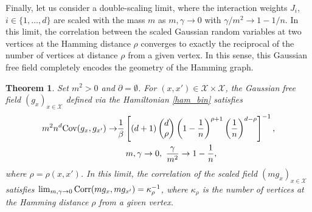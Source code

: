 \documentclass[a4paper,11pt]{article}
\theoremstyle{plain}
\newtheorem{theorem}{Theorem}[section]
\theoremstyle{definition}
\begin{document}
Finally, let us consider a double-scaling limit, where
the interaction weights $J_i$, $i\in\{1,\ldots,d\}$
are scaled with the mass $m$ as $m,\gamma\to 0$ with
$\gamma/m^2\to 1-1/n$. In this limit, the correlation
between the scaled Gaussian random variables at two
vertices at the Hamming distance $\rho$ converges to
exactly the reciprocal of the number of vertices at
distance $\rho$ from a given vertex. In this sense, this
Gaussian free field completely encodes the geometry
of the Hamming graph.

\begin{theorem}\label{thm:binom:lim}
  Set $m^2>0$ and $\partial=\emptyset$. For
  $(x,x')\in\mathcal{X}\times\mathcal{X}$, the Gaussian free field
  $(g_x)_{x\in\mathcal{X}}$ defined via
  the Hamiltonian \eqref{ham_bin} satisfies
  \begin{align*}
    m^2n^d{\rm Cov}(g_x,g_{x'})\to &
    \frac{1}{\beta}\left[(d+1)\begin{pmatrix}d\\\rho\end{pmatrix}\left(1-\frac{1}{n}\right)^{\rho+1}\left(\frac{1}{n}\right)^{d-\rho}\right]^{-1}, \\
   & \quad m,\gamma\to 0,~\frac{\gamma}{m^2}\to 1-\frac{1}{n},
  \end{align*}
  where $\rho=\rho(x,x')$. In this limit, the correlation of the scaled field
  $(mg_x)_{x\in\mathcal{X}}$ satisfies
  $\lim_{m,\gamma\to 0}{\rm Corr}(mg_x,mg_{x'})=\kappa_{\rho}^{-1}$,
  where $\kappa_{\rho}$ is the number of vertices at the Hamming
  distance $\rho$ from a given vertex.
\end{theorem}  
  
\end{document}
